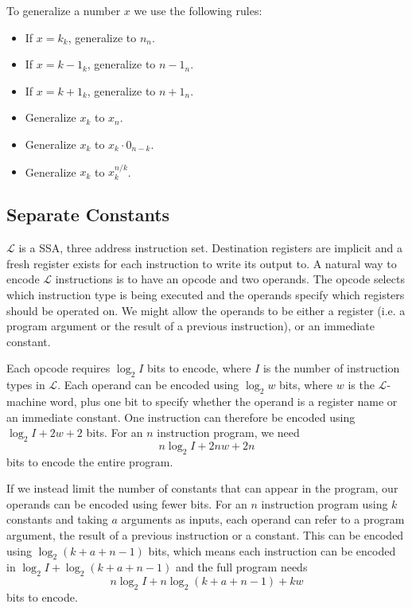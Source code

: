 \documentclass[a4paper]{llncs}
\begin{document}
To generalize a number $x$ we use the following rules:

\begin{itemize}
 \item If $x = k_k$, generalize to $n_n$.
 \item If $x = k-1_k$, generalize to $n-1_n$.
 \item If $x = k+1_k$, generalize to $n+1_n$.
 \item Generalize $x_k$ to $x_n$.
 \item Generalize $x_k$ to $x_k \cdot 0_{n-k}$.
 \item Generalize $x_k$ to $x_k^{n / k}$.
\end{itemize}


\subsection{Separate Constants}

$\mathcal{L}$ is a SSA, three address instruction set.  Destination registers
are implicit and a fresh register exists for each instruction to write its
output to.  A natural way to encode $\mathcal{L}$ instructions is to have an
opcode and two operands.  The opcode selects which instruction type is being
executed and the operands specify which registers should be operated on.
We might allow the operands to be either a register (i.e. a program argument
or the result of a previous instruction), or an immediate constant.

Each opcode requires $\log_2 I$ bits to encode, where $I$ is the number
of instruction types in $\mathcal{L}$.  Each operand can be encoded using
$\log_2 w$ bits, where $w$ is the $\mathcal{L}$-machine word, plus one
bit to specify whether the operand is a register name or an immediate constant.
One instruction can therefore be encoded using $\log_2 I + 2w + 2$ bits.
For an $n$ instruction program, we need $$n \log_2 I + 2nw + 2n$$ bits to encode
the entire program.

If we instead limit the number of constants that can appear in the program,
our operands can be encoded using fewer bits.  For an $n$ instruction program
using $k$ constants and taking $a$ arguments as inputs, each operand can refer
to a program argument, the result of a previous instruction or a constant.
This can be encoded using $\log_2 (k+a+n-1)$ bits, which means each instruction
can be encoded in $\log_2 I + \log_2 (k + a + n - 1)$ and the full program
needs $$n \log_2 I + n \log_2 (k + a + n - 1) + kw$$ bits to encode.
\end{document}
